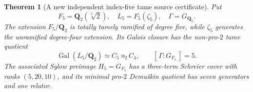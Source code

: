 \documentclass[11pt]{article}
\newtheorem{theorem}{Theorem}[section]
\theoremstyle{definition}
\begin{document}
\begin{theorem}[A new independent index-five tame source certificate]
\label{thm:dyadic-f135-index-five-exact-certificate}
Put
\[
F_5=\mathbf Q_2(\sqrt[5]2),
\quad
L_5=F_5(\zeta_5),
\quad
\Gamma=G_{\mathbf Q_2}.
\]
The extension $F_5/\mathbf Q_2$
is totally tamely ramified
of degree five, while
$\zeta_5$ generates the
unramified degree-four
extension.  Its Galois
closure has the
non-pro-$2$ tame
quotient
\begin{equation}\label{eq:dyadic-f135-index-five-quotient}
\boxed{\quad
\operatorname{Gal}(L_5/\mathbf Q_2)
\simeq C_5\rtimes_{2}C_4,
\qquad
[\,\Gamma:G_{F_5}\,]=5.
\quad}
\end{equation}
The associated
Sylow preimage
$H_5=G_{F_5}$
has a three-term
Schreier cover
with ranks
$(5,20,10)$,
and its minimal
pro-$2$
Demu\v{s}kin quotient
has seven generators
and one relator.


\end{theorem}
\end{document}
